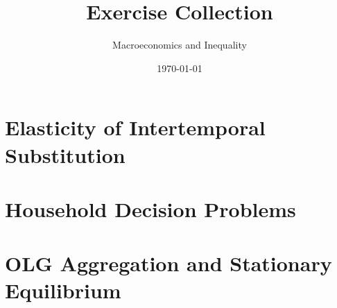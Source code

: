 \documentclass[12pt,a4paper,addpoints]{exam}
\title{Exercise Collection}
\author{Macroeconomics and Inequality}
\date{\today}
\begin{document}
\maketitle

\tableofcontents
\clearpage

\begin{questions}

\section{Elasticity of Intertemporal Substitution}

\clearpage

\clearpage

\section{Household Decision Problems}

\clearpage

\clearpage

\clearpage

\clearpage

\clearpage

%

\section{OLG Aggregation and Stationary Equilibrium}
%
%
%
%

\clearpage


\end{questions}
\end{document}
